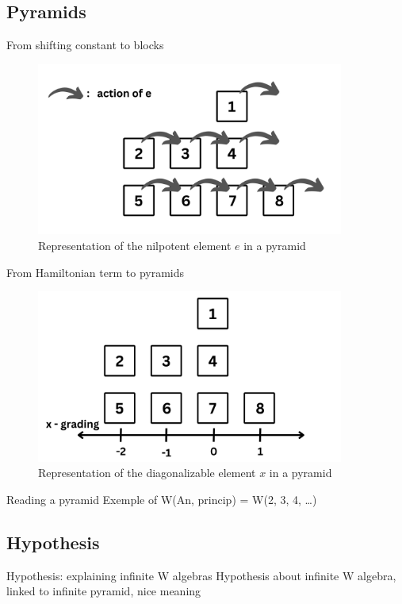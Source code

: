 \documentclass{beamer}
\begin{document}
\subsection{Pyramids}


\begin{frame}{From shifting constant to blocks}
    \begin{figure}
        \centering
        \includegraphics[width=0.9\textwidth]{pyramid}
        \caption{Representation of the nilpotent element $e$ in a pyramid}
    \end{figure}
\end{frame}

\begin{frame}{From Hamiltonian term to pyramids}
    \begin{figure}
        \centering
        \includegraphics[width=0.9\textwidth]{pyramid2}
        \caption{Representation of the diagonalizable element $x$ in a pyramid}
    \end{figure}
\end{frame}

\begin{frame}{Reading a pyramid}
    Exemple of W(An, princip) = W(2, 3, 4, \dots)
\end{frame}


\subsection{Hypothesis}


\begin{frame}{Hypothesis: explaining infinite W algebras}
    Hypothesis about infinite W algebra, linked to infinite pyramid, nice meaning
\end{frame}
\end{document}
